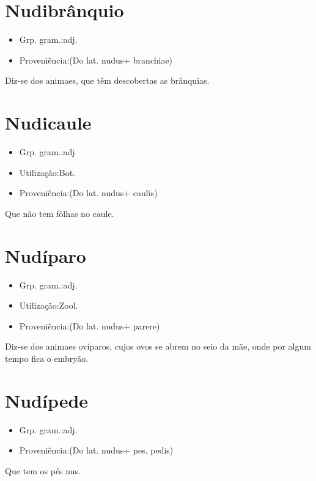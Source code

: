 \section{Nudibrânquio}
\begin{itemize}
\item {Grp. gram.:adj.}
\end{itemize}
\begin{itemize}
\item {Proveniência:(Do lat. \textunderscore nudus\textunderscore  + \textunderscore branchiae\textunderscore )}
\end{itemize}
Diz-se dos animaes, que têm descobertas as brânquias.
\section{Nudicaule}
\begin{itemize}
\item {Grp. gram.:adj}
\end{itemize}
\begin{itemize}
\item {Utilização:Bot.}
\end{itemize}
\begin{itemize}
\item {Proveniência:(Do lat. \textunderscore nudus\textunderscore  + \textunderscore caulis\textunderscore )}
\end{itemize}
Que não tem fôlhas no caule.
\section{Nudíparo}
\begin{itemize}
\item {Grp. gram.:adj.}
\end{itemize}
\begin{itemize}
\item {Utilização:Zool.}
\end{itemize}
\begin{itemize}
\item {Proveniência:(Do lat. \textunderscore nudus\textunderscore  + \textunderscore parere\textunderscore )}
\end{itemize}
Diz-se dos animaes ovíparos, cujos ovos se abrem no seio da mãe, onde por algum tempo fica o embryão.
\section{Nudípede}
\begin{itemize}
\item {Grp. gram.:adj.}
\end{itemize}
\begin{itemize}
\item {Proveniência:(Do lat. \textunderscore nudus\textunderscore  + \textunderscore pes\textunderscore , \textunderscore pedis\textunderscore )}
\end{itemize}
Que tem os pés nus.
